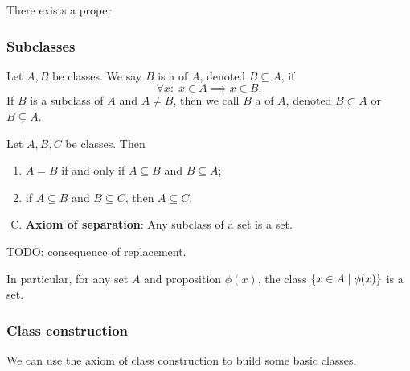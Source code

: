 \begin{proposition}
There exists a proper
\end{proposition}

\subsubsection{Subclasses}
\begin{definition}
Let $A,B$ be classes. We say $B$ is a  of $A$, denoted $B\subseteq A$, if
\[ \forall x: \; x\in A \implies x\in B. \]
If $B$ is a subclass of $A$ and $A \neq B$, then we call $B$ a  of $A$, denoted $B \subset A$ or $B \subsetneq A$.
\end{definition}

\begin{lemma}
Let $A,B,C$ be classes. Then
\begin{enumerate}
\item $A = B$ \textup{if and only if} $A \subseteq B$ and $B \subseteq A$;
\item if $A \subseteq B$ and $B\subseteq C$, then $A \subseteq C$.
\end{enumerate}
\end{lemma}

\begin{enumerate}[(A)] \setcounter{enumi}{2}
\item \textbf{Axiom of separation}: Any subclass of a set is a set.
\end{enumerate}
TODO: consequence of replacement.

In particular, for any set $A$ and proposition $\phi(x)$, the class $\left\{ x\in A \;\middle|\; \phi(x) \right\}$ is a set.

\subsubsection{Class construction}
We can use the axiom of class construction to build some basic classes.

